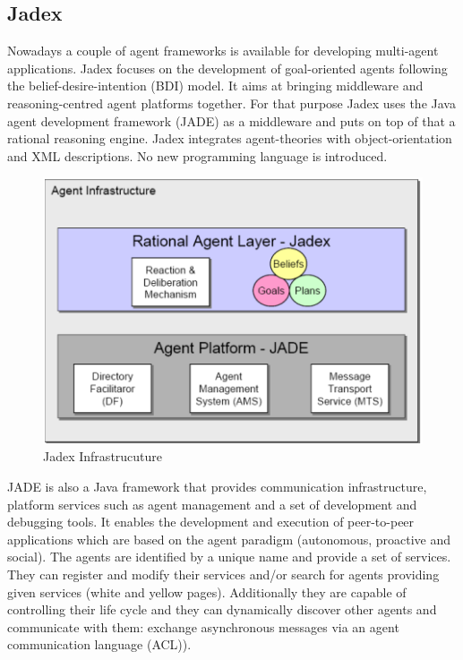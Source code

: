\subsection{Jadex}
Nowadays a couple of agent frameworks is available for developing multi-agent applications. \cite{Mangina} Jadex focuses on the development of goal-oriented agents following the belief-desire-intention (BDI) model. It aims at bringing middleware and reasoning-centred agent platforms together. For that purpose Jadex uses the Java agent development framework (JADE) as a middleware and puts on top of that a rational reasoning engine. Jadex integrates agent-theories with object-orientation and XML descriptions. No new programming language is introduced. 
\begin{figure}
	\centering
	\includegraphics{images/Jadex_infrastructure.png}
	\caption{Jadex Infrastrucuture}
	\label{fig1}
\end{figure}
JADE is also a Java framework that provides communication infrastructure, platform services such as agent management and a set of development and debugging tools. It enables the development and execution of  peer-to-peer applications which are based on the agent paradigm (autonomous, proactive and social). The agents are identified by a unique name and provide a set of services. They can register and modify their services and/or search for agents providing given services (white and yellow pages). Additionally they are capable of controlling their life cycle and they can dynamically discover other agents and communicate with them: exchange asynchronous messages via an agent communication language (ACL)). 

